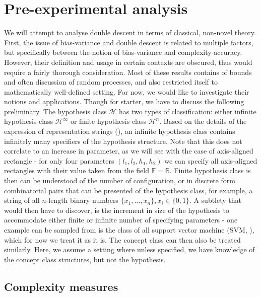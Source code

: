 \documentclass[twoside,10pt]{article}
\begin{document}
\section{Pre-experimental analysis}
We will attempt to analyse double descent in terms of classical, non-novel theory. First, the issue of bias-variance and double descent is related to multiple factors, but specifically between the notion of bias-variance and complexity-accuracy. However, their definition and usage in certain contexts are obscured, thus would require a fairly thorough consideration. Most of these results contains of bounds and often discussion of random processes, and also restricted itself to mathematically well-defined setting. For now, we would like to investigate their notions and applications. Though for starter, we have to discuss the following preliminary. The hypothesis class $\mathcal{H}$ has two types of classification: either infinite hypothesis class $\mathcal{H}^{\infty}$ or finite hypothesis class $\mathcal{H}^{n}$. Based on the details of the expression of representation strings (\cite{10.5555/200548}), an infinite hypothesis class contains infinitely many specifiers of the hypothesis structure. Note that this does not correlate to an increase in parameter, as we will see with the case of axis-aligned rectangle - for only four parameters $(l_{1},l_{2},h_{1},h_2)$ we can specify all axis-aligned rectangles with their value taken from the field $\mathbb{F}=\mathbb{R}$. Finite hypothesis class is then can be understood of the number of configuration, or in discrete form combinatorial pairs that can be presented of the hypothesis class, for example, a string of all $n$-length binary numbers $\{x_{1},\dots,x_{n}\}, x_{i}\in \{0,1\}$. A subtlety that would then have to discover, is the increment in size of the hypothesis to accommodate either finite or infinite number of specifying parameters - one example can be sampled from is the class of all support vector machine (SVM, \cite{Vapnik1999-VAPTNO}), which for now we treat it as it is. The concept class can then also be treated similarly. Here, we assume a setting where unless specified, we have knowledge of the concept class structures, but not the hypothesis. 
\subsection{Complexity measures}
\end{document}
